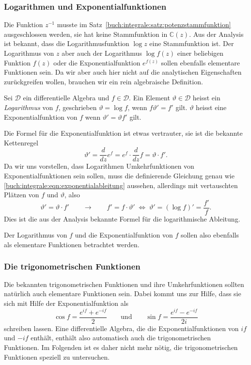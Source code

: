 \subsubsection{Logarithmen und Exponentialfunktionen}
Die Funktion $z^{-1}$ musste im
Satz~\ref{buch:integrale:satz:potenzstammfunktion}
ausgeschlossen werden, sie hat keine Stammfunktion in $\mathbb{C}(z)$.
Aus der Analysis ist bekannt, dass die Logarithmusfunktion $\log z$ 
eine Stammfunktion ist.
Der Logarithmus von $z$ aber auch der Logarithmus $\log f(z)$
einer beliebigen Funktion $f(z)$ oder die Exponentialfunktion $e^{f(z)}$
sollen ebenfalls elementare Funktionen sein.
Da wir aber auch hier nicht auf die analytischen Eigenschaften zurückgreifen
wollen, brauchen wir ein rein algebraische Definition.

\begin{definition}
\label{buch:integrale:def:logexp}
Sei $\mathscr{D}$ ein differentielle Algebra und $f\in\mathscr{D}$.
Ein Element $\vartheta\in\mathscr{D}$ heisst ein {\em Logarithmus}
von $f$, geschrieben $\vartheta = \log f$, wenn $f\vartheta' = f'$ gilt.
$\vartheta$ heisst eine Exponentialfunktion von $f$ wenn
$\vartheta'=\vartheta f'$ gilt.
\end{definition}

Die Formel für die Exponentialfunktion ist etwas vertrauter, sie ist
die bekannte Kettenregel
\begin{equation}
\vartheta'
=
\frac{d}{dz} e^f
=
e^f \cdot \frac{d}{dz} f
=
\vartheta \cdot f'.
\label{buch:integrale:eqn:exponentialableitung}
\end{equation}
Da wir uns vorstellen, dass Logarithmen Umkehrfunktionen von 
Exponentialfunktionen sein sollen, 
muss die definierende Gleichung genau wie
\eqref{buch:integrale:eqn:exponentialableitung}
aussehen, allerdings mit vertauschten Plätzen von $f$ und $\vartheta$,
also 
\begin{equation}
\vartheta' = \vartheta\cdot f'
\qquad
\rightarrow
\qquad
f' = f\cdot \vartheta'
\;\Leftrightarrow\;
\vartheta' = (\log f)' = \frac{f'}{f}.
\label{buch:integrale:eqn:logarithmischeableitung}
\end{equation}
Dies ist die aus der Analysis bekannte Formel für die logarithmische
Ableitung.

Der Logarithmus von $f$ und die Exponentialfunktion von $f$ sollen
also ebenfalls als elementare Funktionen betrachtet werden.

\subsubsection{Die trigonometrischen Funktionen}
Die bekannten trigonometrischen Funktionen und ihre Umkehrfunktionen
sollten natürlich auch elementare Funktionen sein.
Dabei kommt uns zur Hilfe, dass sie sich mit Hilfe der Exponentialfunktion
als
\[
\cos f = \frac{e^{if}+e^{-if}}2
\qquad\text{und}\qquad
\sin f = \frac{e^{if}-e^{-if}}{2i}
\]
schreiben lassen.
Eine differentielle Algebra, die die Exponentialfunktionen von $if$ und
$-if$ enthält, enthält also automatisch auch die trigonometrischen
Funktionen.
Im Folgenden ist es daher nicht mehr nötig, die trigonometrischen
Funktionen speziell zu untersuchen.

